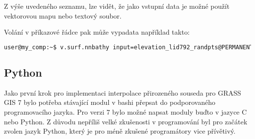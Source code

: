 \documentclass[12pt,a4paper]{article}
\begin{document}
Z výše uvedeného seznamu, lze vidět, že jako vstupní data je možné použít vektorovou mapu nebo textový soubor.


Volání v příkazové řádce pak může vypadata například takto:
\begin{lstlisting}[language=bash,caption={bash version}]
user@my_comp:~$ v.surf.nnbathy input=elevation_lid792_randpts@PERMANENT output=raster_map zcolumn=value alg=nn
\end{lstlisting}

\begin{comment}
\subsubsection{r.surf.nnbathy}\footnote{\url{http://svn.osgeo.org/grass/grass-addons/grass6/vector/r.surf.nnbathy/description.html}}
Modul \textit{r.surf.nnbathy} pracuje na podobném principu jako modul \textit{v.surf.nnbathy}, jen pro rastrová data. Při volání je možnost použít méně parametrů.
\begin{description}
\item[output] Proměnná typu \textit{string}, název výstupní rastrové mapy, jediný povinný parametr.
\item[input] Proměnná typu \textit{string}, název vstupní vektorové mapy.
\item[[alg]] Proměnná typu \textit{string}, název použitého algoritmu.
\end{description}

Volání v příkazové řádce pak může vypadata například takto:
\begin{lstlisting}[language=bash,caption={bash version}]
user@my_comp:~$ v.surf.nnbathy input=elevation_lid792_randpts@PERMANENT output=raster_map zcolumn=value alg=nn
\end{lstlisting}
\end{comment}

\newpage
\subsection{Python}
Jako první krok pro implementaci interpolace přirozeného souseda pro GRASS GIS 7 bylo potřeba stávající modul v bashi přepsat do podporovaného programovacího jazyka. Pro verzi 7 bylo možné napsat moduly buďto v jazyce C nebo Python. Z důvodu nepříliš velké zkušenosti v programování byl pro začátek zvolen jazyk Python, který je pro méně zkušené programátory vice přívětivý. 
\end{document}
